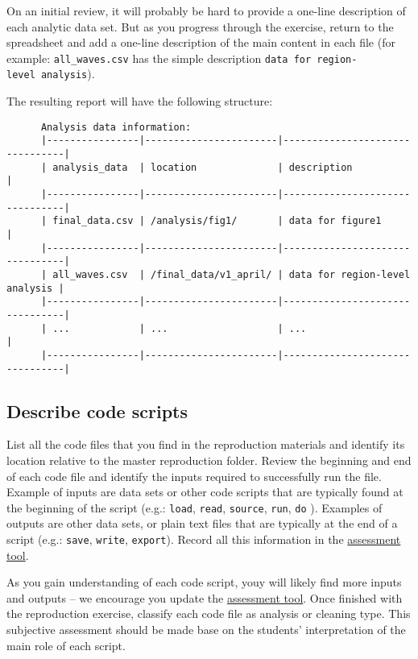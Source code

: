 \documentclass[]{book}
\begin{document}
On an initial review, it will probably be hard to provide a one-line description of each analytic data set. But as you progress through the exercise, return to the spreadsheet and add a one-line description of the main content in each file (for example: \texttt{all\_waves.csv} has the simple description \texttt{data\ for\ region-level\ analysis}).

The resulting report will have the following structure:

\begin{verbatim}
      Analysis data information:
      |----------------|-----------------------|--------------------------------|
      | analysis_data  | location              | description                    |
      |----------------|-----------------------|--------------------------------|
      | final_data.csv | /analysis/fig1/       | data for figure1               |
      |----------------|-----------------------|--------------------------------|
      | all_waves.csv  | /final_data/v1_april/ | data for region-level analysis |
      |----------------|-----------------------|--------------------------------|
      | ...            | ...                   | ...                            |
      |----------------|-----------------------|--------------------------------|
\end{verbatim}

\hypertarget{describe-code-scripts}{%
\subsection{Describe code scripts}\label{describe-code-scripts}}

List all the code files that you find in the reproduction materials and identify its location relative to the master reproduction folder. Review the beginning and end of each code file and identify the inputs required to successfully run the file. Example of inputs are data sets or other code scripts that are typically found at the beginning of the script (e.g.: \texttt{load}, \texttt{read}, \texttt{source}, \texttt{run}, \texttt{do} ). Examples of outputs are other data sets, or plain text files that are typically at the end of a script (e.g.: \texttt{save}, \texttt{write}, \texttt{export}). Record all this information in the \href{https://docs.google.com/spreadsheets/d/1LUIdVFH0OfR70C7z07TYeE-uWzKI_JIeWUMaYhqEKK0/edit\#gid=1617799822\&range=A1}{assessment tool}.

As you gain understanding of each code script, youy will likely find more inputs and outputs -- we encourage you update the \href{https://docs.google.com/spreadsheets/d/1LUIdVFH0OfR70C7z07TYeE-uWzKI_JIeWUMaYhqEKK0/edit\#gid=1617799822\&range=A1}{assessment tool}. Once finished with the reproduction exercise, classify each code file as analysis or cleaning type. This subjective assessment should be made base on the students' interpretation of the main role of each script.
\end{document}
